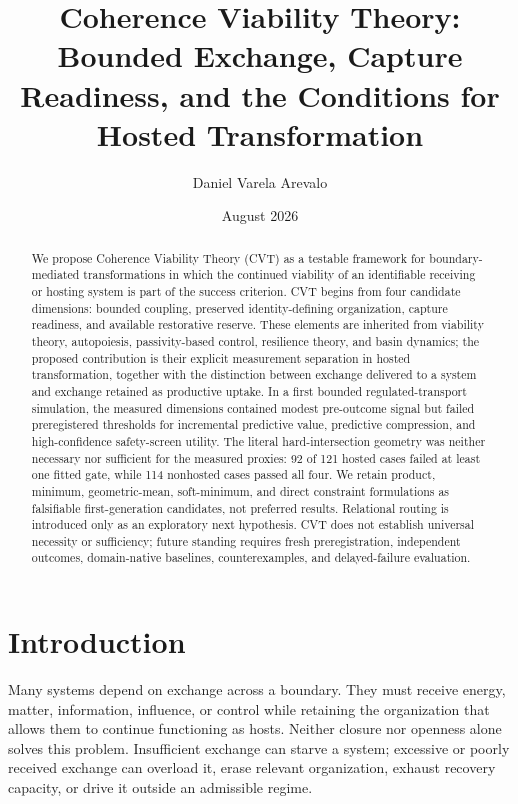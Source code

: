 \documentclass[11pt]{article}
\title{\textbf{Coherence Viability Theory:}\\
Bounded Exchange, Capture Readiness, and the Conditions for Hosted Transformation}
\author{Daniel Varela Arevalo}
\date{August 2026}
\begin{document}
\maketitle

\begin{abstract}
We propose Coherence Viability Theory (CVT) as a testable framework for boundary-mediated transformations in which the continued viability of an identifiable receiving or hosting system is part of the success criterion. CVT begins from four candidate dimensions: bounded coupling, preserved identity-defining organization, capture readiness, and available restorative reserve. These elements are inherited from viability theory, autopoiesis, passivity-based control, resilience theory, and basin dynamics; the proposed contribution is their explicit measurement separation in hosted transformation, together with the distinction between exchange delivered to a system and exchange retained as productive uptake. In a first bounded regulated-transport simulation, the measured dimensions contained modest pre-outcome signal but failed preregistered thresholds for incremental predictive value, predictive compression, and high-confidence safety-screen utility. The literal hard-intersection geometry was neither necessary nor sufficient for the measured proxies: 92 of 121 hosted cases failed at least one fitted gate, while 114 nonhosted cases passed all four. We retain product, minimum, geometric-mean, soft-minimum, and direct constraint formulations as falsifiable first-generation candidates, not preferred results. Relational routing is introduced only as an exploratory next hypothesis. CVT does not establish universal necessity or sufficiency; future standing requires fresh preregistration, independent outcomes, domain-native baselines, counterexamples, and delayed-failure evaluation.
\end{abstract}

\section{Introduction}

Many systems depend on exchange across a boundary. They must receive energy, matter, information, influence, or control while retaining the organization that allows them to continue functioning as hosts. Neither closure nor openness alone solves this problem. Insufficient exchange can starve a system; excessive or poorly received exchange can overload it, erase relevant organization, exhaust recovery capacity, or drive it outside an admissible regime.
\end{document}
